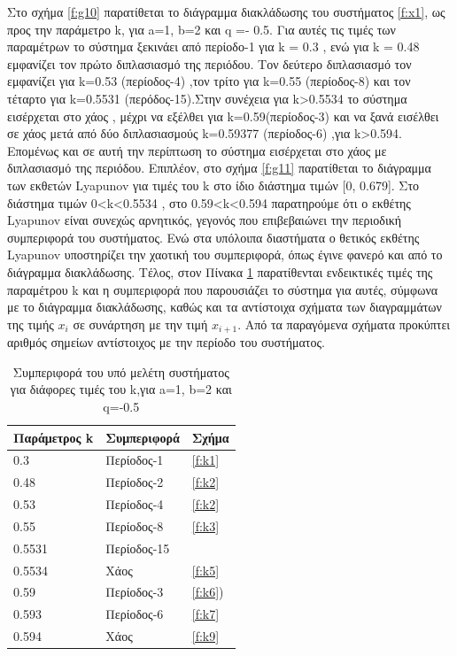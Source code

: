 Στο σχήμα \ref{f:g10} παρατίθεται το διάγραμμα διακλάδωσης του συστήματος \ref{f:x1}, ως προς την παράμετρο k, για a=1, b=2 και q =- 0.5. Για αυτές τις τιμές των παραμέτρων το σύστημα ξεκινάει από περίοδο-1 για k = 0.3 , ενώ για  k = 0.48 εμφανίζει τον πρώτο διπλασιασμό της περιόδου. Τον δεύτερο διπλασιασμό τον εμφανίζει για k=0.53 (περίοδος-4) ,τον τρίτο για k=0.55 (περίοδος-8) και τον τέταρτο για k=0.5531 (περόδος-15).Στην συνέχεια για k>0.5534 το σύστημα εισέρχεται στο χάος , μέχρι να εξέλθει  για k=0.59(περίοδος-3) και να ξανά εισέλθει σε χάος μετά από δύο διπλασιασμούς k=0.59377 (περίοδος-6) ,για k>0.594.
Επομένως και σε αυτή την περίπτωση το σύστημα εισέρχεται στο χάος με διπλασιασμό της περιόδου. 
Επιπλέον, στο σχήμα \ref{f:g11} παρατίθεται το διάγραμμα των εκθετών Lyapunov για τιμές του k στο ίδιο διάστημα τιμών [0, 0.679].  Στο διάστημα τιμών   0<k<0.5534 , στο 0.59<k<0.594 παρατηρούμε ότι ο εκθέτης Lyapunov είναι συνεχώς αρνητικός, γεγονός που επιβεβαιώνει την περιοδική συμπεριφορά του συστήματος. Ενώ στα υπόλοιπα διαστήματα ο θετικός εκθέτης Lyapunov υποστηρίζει την χαοτική του συμπεριφορά, όπως έγινε φανερό και από το διάγραμμα διακλάδωσης.
Τέλος, στον Πίνακα \ref{tab:abc2} παρατίθενται ενδεικτικές τιμές της παραμέτρου k και η συμπεριφορά που παρουσιάζει το σύστημα για αυτές, σύμφωνα με το διάγραμμα διακλάδωσης, καθώς και τα αντίστοιχα σχήματα των διαγραμμάτων της τιμής \(x_i\) σε συνάρτηση με την τιμή \(x_{i+1}\). Από τα παραγόμενα σχήματα προκύπτει αριθμός σημείων αντίστοιχος με την περίοδο του συστήματος.

\begin{table}[h!]
	\centering
	\begin{tabular}{l | l | l}
		Παράμετρος k & Συμπεριφορά & Σχήμα\\
		\hline
		0.3 &  Περίοδος-1 & \ref{f:k1}\\
		0.48& Περίοδος-2 & \ref{f:k2}\\
		0.53& Περίοδος-4 & \ref{f:k2}\\
		0.55 &  Περίοδος-8 & \ref{f:k3}\\
		0.5531 & Περίοδος-15 & \ \\
		0.5534 & Χάος & \ref{f:k5}\\
		0.59 & Περίοδος-3 & \ref{f:k6})\\
		0.593 & Περίοδος-6 & \ref{f:k7}\\
		0.594 & Χάος & \ref{f:k9}\\
	\end{tabular}
	\caption{ Συμπεριφορά του υπό μελέτη συστήματος για διάφορες τιμές του k,για a=1, b=2 και q=-0.5}
	\label{tab:abc2}
\end{table}

